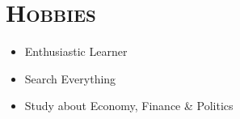 \documentclass[line,margin]{res}
\begin{document}
\begin{resume}
\begin{spacing}{1.1}
\begin{itemize}
\end{itemize}

\section{\textsc{Hobbies}}
\begin{itemize}
\item Enthusiastic Learner
\item Search Everything %
\item Study about Economy, Finance \& Politics
\end{itemize}

\end{spacing}
\end{resume}
\end{document}
